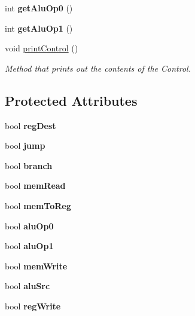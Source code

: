 \begin{DoxyCompactItemize}
int {\bfseries get\+Alu\+Op0} ()
\item 
\mbox{\label{class_control_unit_abeb8981fe2c90430b6aca8fa14ae9cab}} 
int {\bfseries get\+Alu\+Op1} ()
\item 
\mbox{\label{class_control_unit_a103986a57f14e0b13da4e5785d8bb034}} 
void \mbox{\hyperlink{class_control_unit_a103986a57f14e0b13da4e5785d8bb034}{print\+Control}} ()
\begin{DoxyCompactList}\small\item\em Method that prints out the contents of the Control. \end{DoxyCompactList}\end{DoxyCompactItemize}
\subsection*{Protected Attributes}
\begin{DoxyCompactItemize}
\item 
\mbox{\label{class_control_unit_a1a358866ea9b1cdf2eb9991aa53dcac4}} 
bool {\bfseries reg\+Dest}
\item 
\mbox{\label{class_control_unit_a6c1a54a1add2956c4b7a8530fff15694}} 
bool {\bfseries jump}
\item 
\mbox{\label{class_control_unit_a762297f2d108f6460568d70cda61a48a}} 
bool {\bfseries branch}
\item 
\mbox{\label{class_control_unit_a7ed126ebae561f9be40115eb8af2ea96}} 
bool {\bfseries mem\+Read}
\item 
\mbox{\label{class_control_unit_aa6af09909a643347c22da2cb4ecbb296}} 
bool {\bfseries mem\+To\+Reg}
\item 
\mbox{\label{class_control_unit_a315e08378f8dd09eb6a79591f786e868}} 
bool {\bfseries alu\+Op0}
\item 
\mbox{\label{class_control_unit_a9cba72addede51df99643d7ced8cf4f5}} 
bool {\bfseries alu\+Op1}
\item 
\mbox{\label{class_control_unit_aa0fb2a86fa2aec280a54fb5b16764228}} 
bool {\bfseries mem\+Write}
\item 
\mbox{\label{class_control_unit_a83ad7dabedcb59e95819eb586504c65a}} 
bool {\bfseries alu\+Src}
\item 
\mbox{\label{class_control_unit_afabd2fdec59ff539540aca5549203d89}} 
bool {\bfseries reg\+Write}
\end{DoxyCompactItemize}


